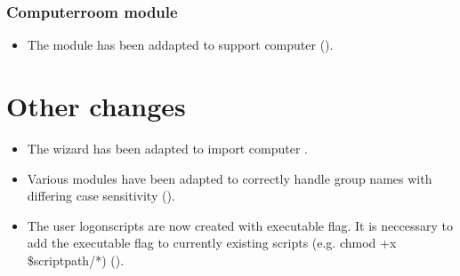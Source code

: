 
\subsubsection{Computerroom module}
\begin{itemize}
\item The  module has been addapted to support  computer ().
\end{itemize}



\section{Other changes}
\begin{itemize}
\item The  wizard has been adapted to import  computer .
\item Various  modules have been adapted to correctly handle group names with differing case sensitivity ().
\item The user logonscripts are now created with executable flag.
 It is neccessary to add the executable flag to currently existing scripts (e.g. chmod +x \$scriptpath/*) ().
\end{itemize}
